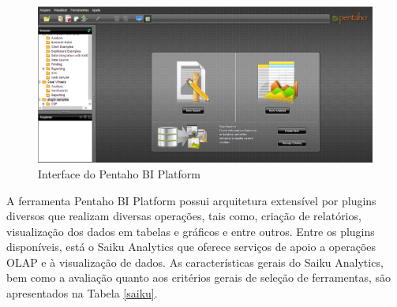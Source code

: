 \begin{figure}[ht!]
\begin{center}
\includegraphics[bb=0 0 1366 440, scale=0.45]{figuras/pentahoBI.png}
\caption{Interface do Pentaho BI Platform}
\label{BIplatform}
\end{center}
\end{figure}
\FloatBarrier
 

A ferramenta Pentaho BI Platform possui arquitetura extensível por plugins diversos que realizam diversas operações, tais como, criação de relatórios, visualização dos dados em tabelas e gráficos e entre outros. Entre os plugins disponíveis, está o Saiku Analytics que oferece serviços de apoio a operações OLAP e à visualização de dados. As características gerais do Saiku Analytics, bem como a avaliação quanto aos critérios gerais de seleção de ferramentas, são apresentados na Tabela \ref{saiku}. 

